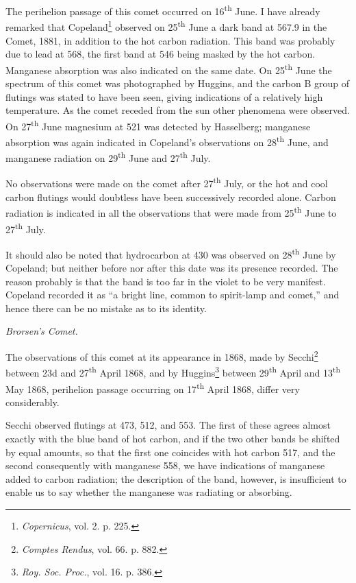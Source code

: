 \documentclass[a4paper, 12pt, oneside, polutonikogreek, english]{article}
\begin{document}
The perihelion passage of this comet occurred on 16\textsuperscript{th} June. I have already remarked that Copeland\footnote{\emph{Copernicus}, vol. 2. p. 225.} observed on 25\textsuperscript{th} June a dark band at 567.9 in the Comet, 1881, in addition to the hot carbon radiation. This band was probably due to lead at 568, the first band at 546 being masked by the hot carbon. Manganese absorption was also indicated on the same date. On 25\textsuperscript{th} June the spectrum of this comet was photographed by Huggins, and the carbon B group of flutings was stated to have been seen, giving indications of a relatively high temperature. As the comet receded from the sun other phenomena were observed. On 27\textsuperscript{th} June magnesium at 521 was detected by Hasselberg; manganese absorption was again indicated in Copeland's observations on 28\textsuperscript{th} June, and manganese radiation on 29\textsuperscript{th} June and 27\textsuperscript{th} July.

No observations were made on the comet after 27\textsuperscript{th} July, or the hot and cool carbon flutings would doubtless have been successively recorded alone. Carbon radiation is indicated in all the observations that were made from 25\textsuperscript{th} June to 27\textsuperscript{th} July.

It should also be noted that hydrocarbon at 430 was observed on 28\textsuperscript{th} June by Copeland; but neither before nor after this date was its presence recorded. The reason probably is that the band is too far in the violet to be very manifest. Copeland recorded it as ``a bright line, common to spirit-lamp and comet,'' and hence there can be no mistake as to its identity.

\emph{Brorsen's Comet.}

The observations of this comet at its appearance in 1868, made by Secchi\footnote{\emph{Comptes Rendus}, vol. 66. p. 882.} between 23d and 27\textsuperscript{th} April 1868, and by Huggins\footnote{\emph{Roy. Soc. Proc.}, vol. 16. p. 386.} between 29\textsuperscript{th} April and 13\textsuperscript{th} May 1868, perihelion passage occurring on 17\textsuperscript{th} April 1868, differ very considerably.

Secchi observed flutings at 473, 512, and 553. The first of these agrees almost exactly with the blue band of hot carbon, and if the two other bands be shifted by equal amounts, so that the first one coincides with hot carbon 517, and the second consequently with manganese 558, we have indications of manganese added to carbon radiation; the description of the band, however, is insufficient to enable us to say whether the manganese was radiating or absorbing.
\end{document}
